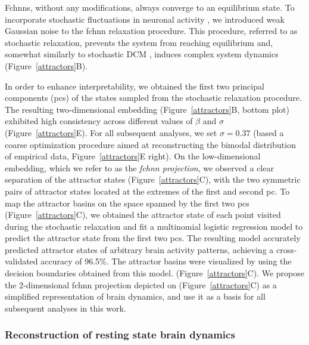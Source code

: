 \documentclass{article}
\begin{document}
Fc\acrshort{hnn}s, without any modifications, always converge to an equilibrium state.
To incorporate stochastic fluctuations in neuronal activity \citep{robinson2005multiscale}, we introduced weak
Gaussian noise to the \acrshort{fchnn} relaxation procedure. This procedure, referred to as stochastic relaxation, prevents the system from reaching equilibrium and, somewhat similarly to stochastic DCM \citep{daunizeau2012stochastic}, induces complex system dynamics (Figure~\ref{attractors}B).

In order to enhance interpretability, we obtained the first two principal components (\acrshort{pc}s) of the states sampled from the stochastic relaxation procedure.
The resulting two-dimensional embedding (Figure~\ref{attractors}B, bottom plot) exhibited high consistency across different values of $\beta$ and $\sigma$ (Figure~\ref{attractors}E).
For all subsequent analyses, we set $\sigma=0.37$ (based a coarse optimization procedure aimed at reconstructing the bimodal distribution of empirical data, Figure~\ref{attractors}E right). On the low-dimensional embedding, which we refer to as the \textit{\acrshort{fchnn} projection}, we observed a clear separation of the attractor states (Figure~\ref{attractors}C), with the two symmetric pairs of attractor states located at the extremes of the first and second \acrshort{pc}.
To map the attractor basins on the space spanned by the first two \acrshort{pc}s (Figure~\ref{attractors}C), we obtained the attractor state of each point visited during the stochastic relaxation and fit a multinomial logistic regression model to predict the attractor state from the first two \acrshort{pc}s.
The resulting model accurately predicted attractor states of arbitrary brain activity patterns, achieving a cross-validated accuracy of 96.5\%.
The attractor basins were visualized by using the decision boundaries obtained from this model. (Figure~\ref{attractors}C). We propose the 2-dimensional \acrshort{fchnn} projection depicted on (Figure~\ref{attractors}C) as a simplified representation of brain dynamics, and use it as a basis for all subsequent analyses in this work.

\subsubsection{Reconstruction of resting state brain dynamics}
\end{document}
